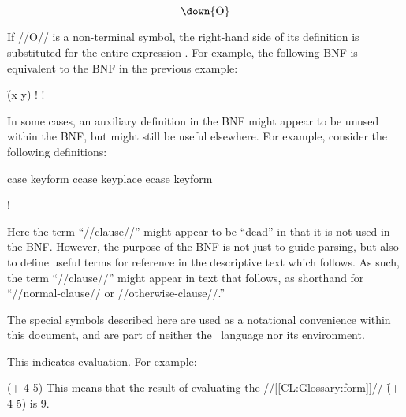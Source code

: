 $$\hbox{\down{O}}$$

\noindent If //O// is a non-terminal symbol, the right-hand side
of its definition is substituted for the entire expression 
.  For example, the following BNF is equivalent to
the BNF in the previous example:

\f{(x  y)}
\Vskip 1pc!
\Vskip 1pc!

\endsubsubsubsection%


In some cases, an auxiliary definition in the BNF might appear to be unused
within the BNF, but might still be useful elsewhere.  For example, consider the
following definitions:

\DefmacWithValues case
		  {keyform   }
		  {}
\DefmacWithValues ccase
		  {keyplace }
		  {}
\DefmacWithValues ecase
		  {keyform  }
		  {}

\Vskip 1pc!

Here the term ``//clause//'' might appear to be ``dead'' in that it
is not used in the BNF.  However, the purpose of the BNF is not just to guide parsing,
but also to define useful terms for reference in the descriptive text which follows.
As such, the term ``//clause//'' might appear in text that follows,
as shorthand for ``//normal-clause// or //otherwise-clause//.''

\endsubsubsubsection%

\endsubsubsection%


The special symbols described here are used as a notational convenience
within this document, and are part of neither the \clisp\ language nor
its environment.

\beginlist
\itemitem{\EV}

This indicates evaluation.
For example:

\code
 (+ 4 5)  
\endcode
This means that the result of
evaluating the //[[CL:Glossary:form]]// \f{(+ 4 5)} is \f{9}.
                                                                 

